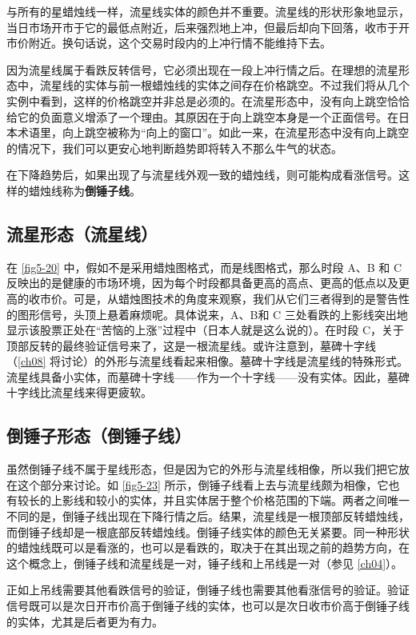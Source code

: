 与所有的星蜡烛线一样，流星线实体的颜色并不重要。流星线的形状形象地显示，当日市场开市于它的最低点附近，后来强烈地上冲，但最后却向下回落，收市于开市价附近。换句话说，这个交易时段内的上冲行情不能维持下去。

因为流星线属于看跌反转信号，它必须出现在一段上冲行情之后。在理想的流星形态中，流星线的实体与前一根蜡烛线的实体之间存在价格跳空。不过我们将从几个实例中看到，这样的价格跳空并非总是必须的。在流星形态中，没有向上跳空恰恰给它的负面意义增添了一个理由。其原因在于向上跳空本身是一个正面信号。在日本术语里，向上跳空被称为“向上的窗口”。如此一来，在流星形态中没有向上跳空的情况下，我们可以更安心地判断趋势即将转入不那么牛气的状态。

在下降趋势后，如果出现了与流星线外观一致的蜡烛线，则可能构成看涨信号。这样的蜡烛线称为\textbf{倒锤子线}。
\subsection{流星形态（流星线）}
在 \autoref{fig5-20} 中，假如不是采用蜡烛图格式，而是线图格式，那么时段 A、B 和 C 反映出的是健康的市场环境，因为每个时段都具备更高的高点、更高的低点以及更高的收市价。可是，从蜡烛图技术的角度来观察，我们从它们三者得到的是警告性的图形信号，头顶上悬着麻烦呢。具体说来，A、B和 C 三处看跌的上影线突出地显示该股票正处在“苦恼的上涨”过程中（日本人就是这么说的）。在时段 C，关于顶部反转的最终验证信号来了，这是一根流星线。或许注意到，墓碑十字线（\autoref{ch08} 将讨论）的外形与流星线看起来相像。墓碑十字线是流星线的特殊形式。流星线具备小实体，而墓碑十字线——作为一个十字线——没有实体。因此，墓碑十字线比流星线来得更疲软。

\subsection{倒锤子形态（倒锤子线）}
虽然倒锤子线不属于星线形态，但是因为它的外形与流星线相像，所以我们把它放在这个部分来讨论。如 \autoref{fig5-23} 所示，倒锤子线看上去与流星线颇为相像，它也有较长的上影线和较小的实体，并且实体居于整个价格范围的下端。两者之间唯一不同的是，倒锤子线出现在下降行情之后。结果，流星线是一根顶部反转蜡烛线，而倒锤子线却是一根底部反转蜡烛线。倒锤子线实体的颜色无关紧要。同一种形状的蜡烛线既可以是看涨的，也可以是看跌的，取决于在其出现之前的趋势方向，在这个概念上，倒锤子线和流星线是一对，锤子线和上吊线是一对（参见 \autoref{ch04}）。

\begin{tcolorbox}
    正如上吊线需要其他看跌信号的验证，倒锤子线也需要其他看涨信号的验证。验证信号既可以是次日开市价高于倒锤子线的实体，也可以是次日收市价高于倒锤子线的实体，尤其是后者更为有力。
\end{tcolorbox}

